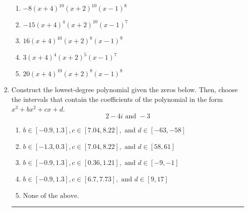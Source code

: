 \documentclass[14pt]{extbook}
\newcommand{\litem}[1]{\item#1\hspace*{-1cm}\rule{\textwidth}{0.4pt}}
\begin{document}
\begin{enumerate}
{\begin{center}
\end{center}
\begin{enumerate}[label=\Alph*.]
\item \( -8(x + 4)^{10} (x + 2)^{10} (x - 1)^{8} \)
\item \( -15(x + 4)^{4} (x + 2)^{10} (x - 1)^{7} \)
\item \( 16(x + 4)^{10} (x + 2)^{8} (x - 1)^{9} \)
\item \( 3(x + 4)^{4} (x + 2)^{5} (x - 1)^{7} \)
\item \( 20(x + 4)^{10} (x + 2)^{8} (x - 1)^{8} \)

\end{enumerate} }
\litem{
Construct the lowest-degree polynomial given the zeros below. Then, choose the intervals that contain the coefficients of the polynomial in the form $x^3+bx^2+cx+d$.\[ 2 - 4 i \text{ and } -3 \]\begin{enumerate}[label=\Alph*.]
\item \( b \in [-0.9, 1.3], c \in [7.04, 8.22], \text{ and } d \in [-63, -58] \)
\item \( b \in [-1.3, 0.3], c \in [7.04, 8.22], \text{ and } d \in [58, 61] \)
\item \( b \in [-0.9, 1.3], c \in [0.36, 1.21], \text{ and } d \in [-9, -1] \)
\item \( b \in [-0.9, 1.3], c \in [6.7, 7.73], \text{ and } d \in [9, 17] \)
\item \( \text{None of the above.} \)

\end{enumerate} }
\end{enumerate}
\end{document}
